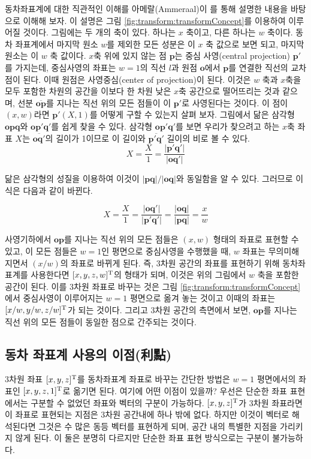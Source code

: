 동차좌표계에 대한 직관적인 이해를 아메랄(Ammeraal)이 \cite{Ammeraal1986}를 통해 설명한 내용을 바탕으로 이해해 보자.
이 설명은 그림 \ref{fig:transform:transformConcept}를 이용하여 이루어질 것이다.
그림에는 두 개의 축이 있다. 하나는 $x$ 축이고, 다른 하나는 $w$ 축이다.
동차 좌표계에서 마지막 원소 $w$를 제외한 모든 성분은 이 $x$ 축 값으로 보면 되고, 마지막 원소는 이 $w$ 축 값이다.
$x$축 위에 있지 않는 점 $\mathbf p$는 중심 사영(central projection) $\mathbf p'$를 가지는데,
중심사영의 좌표는 $w=1$의 직선 $l$과 원점 $\mathbf o$에서 $\mathbf p$를 연결한 직선의 교차점이 된다.
이때 원점은 사영중심(center of projection)이 된다. 
이것은 $w$ 축과 $x$축을 모두 포함한 차원의 공간을 이보다 한 차원 낮은 $x$축 공간으로 떨어뜨리는 것과 같으며,
선분 $\overline{\mathbf o \mathbf p}$를 지나는 직선 위의 모든 점들이 이 $\mathbf p'$로 사영된다는 것이다.
이 점이 $(x,w)$라면 $\mathbf p'(X,1)$를 어떻게 구할 수 있는지 살펴 보자.
그림에서 닮은 삼각형 $\mathbf{opq}$와 $\mathbf{op'q'}$를 쉽게 찾을 수 있다.
삼각형 $\mathbf{op'q'}$를 보면 우리가 찾으려고 하는 $x$축 좌표 $X$는 $\overline{\mathbf{oq'}}$의 길이가 1이므로
이 길이와 $\overline{\mathbf{p'q'}}$ 길이의 비로 볼 수 있다.
$$X = \frac{X}{1} = \frac{|\mathbf{p'q'}|}{|\mathbf{oq'}|}$$

닮은 삼각형의 성질을 이용하여 이것이  ${|\mathbf{pq}|}/{|\mathbf{oq}|}$와 동일함을 알 수 있다.
그러므로 이 식은 다음과 같이 바뀐다.


$$X = \frac{X}{1} = \frac{|\mathbf{oq'}|}{|\mathbf{p'q'}|} = \frac{|\mathbf{oq}|}{|\mathbf{pq}|} = \frac{x}{w} $$


사영기하에서 $\mathbf {op}$를 지나는 직선 위의 모든 점들은 $(x,w)$ 형태의 좌표로 표현할 수 있고,
이 모든 점들은 $w=1$인 평면으로 중심사영을 수행했을 때, $w$ 좌표는 무의미해지면서 $(x/w)$의 좌표로 바뀌게 된다.
즉, 3차원 공간의 좌표를 표현하기 위해 동차좌표계를 사용한다면 $[x,y,z,w]^{\rm T}$의 형태가 되며,
이것은 위의 그림에서 $w$ 축을 포함한 공간이 된다. 이를 3차원 좌표로 바꾸는 것은 그림 \ref{fig:transform:transformConcept}에서
중심사영이 이루어지는 $w=1$ 평면으로 옮겨 놓는 것이고 이때의 좌표는 $[x/w,y/w,z/w]^{\rm T}$가 되는 것이다.
그리고 3차원 공간의 측면에서 보면, $\mathbf {op}$를 지나는 직선 위의 모든 점들이 동일한 점으로 간주되는 것이다.

\subsection{동차 좌표계 사용의 이점(利點)}
3차원 좌표 $[x,y,z]^{\rm T}$를 동차좌표계 좌표로 바꾸는 간단한 방법은 $w=1$ 평면에서의 좌표인 $[x,y,z,1]^{\rm T}$로 옮기면 된다.
여기에 어떤 이점이 있을까?
우선은 단순한 좌표 표현에서는 구분할 수 없었던 좌표와 벡터의 구분이 가능하다. $[x,y,z]^{\rm T}$가 3차원 좌표라면 이 좌표로 표현되는 지점은
3차원 공간내에 하나 밖에 없다. 하지만 이것이 벡터로 해석된다면 그것은 수 많은 동등 벡터를 표현하게 되며, 공간 내의 특별한 지점을 가리키지 않게 된다.
이 둘은 분명히 다르지만 단순한 좌표 표현 방식으로는 구분이 불가능하다.

